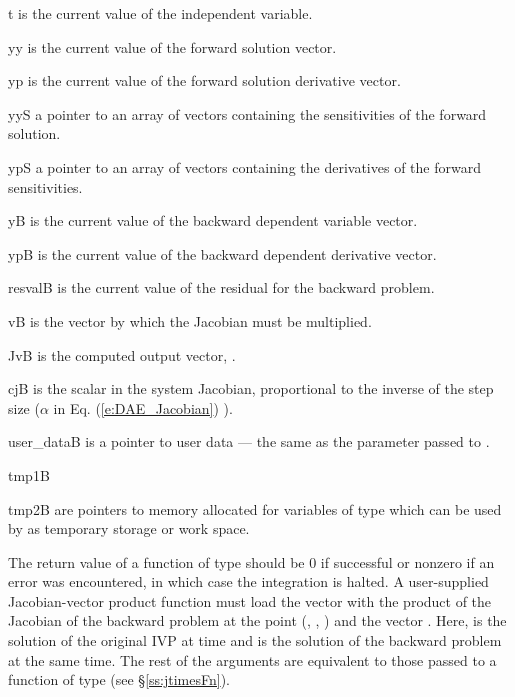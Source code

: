 {
  \begin{args}
  \item[t]
    is the current value of the independent variable.
  \item[yy]
    is the current value of the forward solution vector.
  \item[yp]
    is the current value of the forward solution derivative vector.
  \item[yyS]
    a pointer to an array of  vectors containing the sensitivities of 
    the forward solution.
  \item[ypS]
    a pointer to an array of  vectors containing the derivatives of 
    the forward sensitivities.
  \item[yB]
    is the current value of the backward dependent variable vector.
  \item[ypB]
    is the current value of the backward dependent derivative vector.
  \item[resvalB]
    is the current value of the residual for the backward problem.
  \item[vB]
    is the vector by which the Jacobian must be multiplied.
  \item[JvB]
      is the computed output vector, .
  \item[cjB]
    is the scalar in the system Jacobian, proportional to the inverse of the
    step size ($\alpha$ in Eq. (\ref{e:DAE_Jacobian}) ).
  \item[user\_dataB]
    is a pointer to user data --- the same as the       
    parameter passed to .
  \item[tmp1B]
  \item[tmp2B]
    are pointers to memory allocated for variables of type  which
    can be used by  as temporary storage or work space.
  \end{args}
}
{  
  The return value of a function of type  should be
  $0$ if successful or nonzero if an error was encountered, in which case
  the integration is halted.
}
{
  A user-supplied Jacobian-vector product function must load the vector 
  with the product of the Jacobian of the backward problem 
  at the point (, , ) and the vector . 
  Here,  is the solution of the original IVP at time  and 
   is the solution of the backward problem at the same time.  
  The rest of the arguments are equivalent to those passed to a function of type
   (see \S\ref{ss:jtimesFn}).
}

